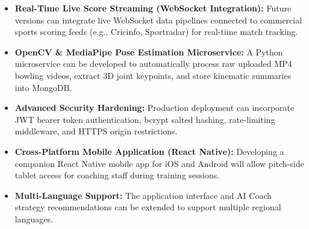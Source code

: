 \begin{itemize}
    \item \textbf{Real-Time Live Score Streaming (WebSocket Integration):} Future versions can integrate live WebSocket data pipelines connected to commercial sports scoring feeds (e.g., Cricinfo, Sportradar) for real-time match tracking.
    \item \textbf{OpenCV \& MediaPipe Pose Estimation Microservice:} A Python microservice can be developed to automatically process raw uploaded MP4 bowling videos, extract 3D joint keypoints, and store kinematic summaries into MongoDB.
    \item \textbf{Advanced Security Hardening:} Production deployment can incorporate JWT bearer token authentication, bcrypt salted hashing, rate-limiting middleware, and HTTPS origin restrictions.
    \item \textbf{Cross-Platform Mobile Application (React Native):} Developing a companion React Native mobile app for iOS and Android will allow pitch-side tablet access for coaching staff during training sessions.
    \item \textbf{Multi-Language Support:} The application interface and AI Coach strategy recommendations can be extended to support multiple regional languages.
\end{itemize}
